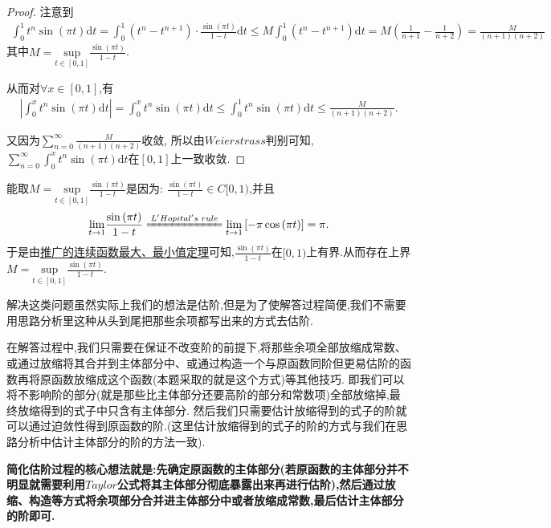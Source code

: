 \documentclass[lang=cn,newtx,10pt,scheme=chinese]{../Template/elegantbook}
\begin{document}
\begin{proof}
{\color{blue}}
注意到\begin{align*}
\int_0^1{t^n\sin \left( \pi t \right) \mathrm{d}t}=\int_0^1{ \left( t^n-t^{n+1} \right) \cdot \frac{\sin \left( \pi t \right)}{1-t}  \mathrm{d}t}\leqslant M\int_0^1{\left( t^n-t^{n+1} \right)}\mathrm{d}t=M\left( \frac{1}{n+1}-\frac{1}{n+2} \right) =\frac{M}{\left( n+1 \right) \left( n+2 \right)}
\end{align*}
其中$M=\underset{t\in \left[ 0,1 \right]}{\mathrm{sup}}\frac{\sin \left( \pi t \right)}{1-t}$.

从而对$\forall x\in[0,1]$,有\begin{align*}
\left| \int_0^x{t^n\sin \left( \pi t \right) \mathrm{d}t} \right|=\int_0^x{t^n\sin \left( \pi t \right) \mathrm{d}t}\leqslant \int_0^1{t^n\sin \left( \pi t \right) \mathrm{d}t}\leqslant \frac{M}{\left( n+1 \right) \left( n+2 \right)}.
\end{align*}



又因为$\sum_{n=0}^{\infty}{\frac{M}{\left( n+1 \right) \left( n+2 \right)}}$收敛,
所以由$Weierstrass$判别可知,$\sum_{n=0}^{\infty}{\int_0^x{t^n\sin \left( \pi t \right) \mathrm{d}t}}$在$\left[ 0,1 \right] $上一致收敛.
\end{proof}
\begin{remark}
能取$M=\underset{t\in \left[ 0,1 \right]}{\mathrm{sup}}\frac{\sin \left( \pi t \right)}{1-t}$是因为:
$\frac{\sin \left( \pi t \right)}{1-t}\in C[0,1)$,并且
\begin{align*}
\underset{t\rightarrow 1}{\lim}\frac{\sin \left( \pi t \right)}{1-t}\xlongequal{L'Hopital's\,\,rule}\underset{t\rightarrow 1}{\lim}\left[ -\pi \cos \left( \pi t \right) \right] =\pi .
\end{align*}
于是由\hyperlink{label}{推广的连续函数最大、最小值定理}可知,$\frac{\sin \left( \pi t \right)}{1-t}$在$[0,1)$上有界.从而存在上界$M=\underset{t\in \left[ 0,1 \right]}{\mathrm{sup}}\frac{\sin \left( \pi t \right)}{1-t}$.
\end{remark}
\begin{remark}
解决这类问题虽然实际上我们的想法是估阶,但是为了使解答过程简便,我们不需要用思路分析里这种从头到尾把那些余项都写出来的方式去估阶.

在解答过程中,我们只需要在保证不改变阶的前提下,将那些余项全部放缩成常数、或通过放缩将其合并到主体部分中、或通过构造一个与原函数同阶但更易估阶的函数再将原函数放缩成这个函数(本题采取的就是这个方式)等其他技巧.
即我们可以将不影响阶的部分(就是那些比主体部分还要高阶的部分和常数项)全部放缩掉,最终放缩得到的式子中只含有主体部分.
然后我们只需要估计放缩得到的式子的阶就可以通过迫敛性得到原函数的阶.(这里估计放缩得到的式子的阶的方式与我们在思路分析中估计主体部分的阶的方法一致).
\end{remark}
\begin{conclusion}\label{简化估阶过程的核心想法}
\textbf{简化估阶过程的核心想法就是:先确定原函数的主体部分(若原函数的主体部分并不明显就需要利用$Taylor$公式将其主体部分彻底暴露出来再进行估阶),然后通过放缩、构造等方式将余项部分合并进主体部分中或者放缩成常数,最后估计主体部分的阶即可.}
\end{conclusion}
\end{document}
